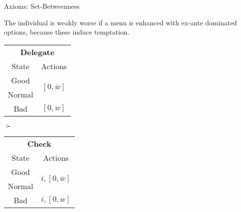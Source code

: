 \documentclass[usenames,dvipsnames,aspectratio=169,11pt, envcountsect, handout]{beamer}
\begin{document}
\begin{frame}{Axioms: Set-Betweenness}\label{betweenness}

	\begin{axiom}\label{ax:sbetweenness}
		The individual is weakly worse if a menu is enhanced with ex-ante dominated options, because these induce temptation.
	\end{axiom}

	\vfill

	\begin{table}[H]
		\centering
		\begin{minipage}{0.4\textwidth}
			\centering
			\begin{tabular}{c | c}
				\multicolumn{2}{c}{\textbf{Delegate}}                                                     \\
				State                & Actions                                                            \\
				\hline
				{\color{blue}Good}   & \multirow{2}{*}{{\color{blue}\( \left[0, \overline{w} \right] \)}} \\
				{\color{blue}Normal} &                                                                    \\
				Bad                  & \( \left[0, w \right]\)                                            \\
			\end{tabular}
			\vspace{0.5cm} %
		\end{minipage}\hspace{0.5cm} %
		\( \succ \)
		\begin{minipage}{0.4\textwidth}
			\centering
			\begin{tabular}{c | c}
				\multicolumn{2}{c}{\textbf{Check}}                                                            \\
				State                & Actions                                                                \\
				\hline
				{\color{blue}Good}   & \multirow{2}{*}{{\color{blue}\( i, \left[ 0, \overline{w} \right] \)}} \\
				{\color{blue}Normal} &                                                                        \\
				Bad                  & \(  i, \left[0, w \right] \)                                           \\
			\end{tabular}
			\vspace{0.5cm} %
		\end{minipage} %
	\end{table}


\end{frame}
\end{document}
